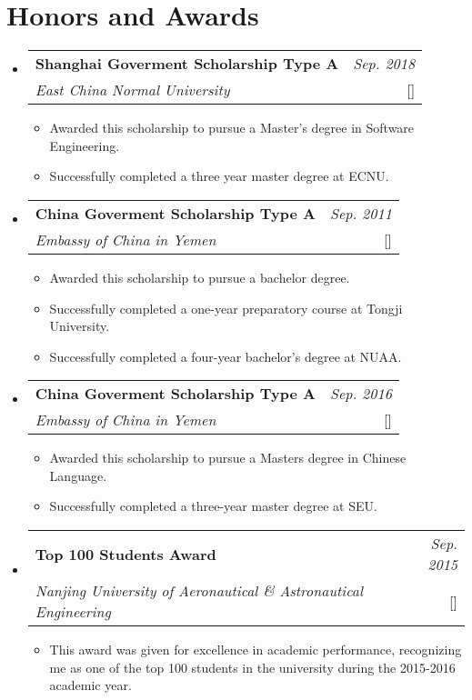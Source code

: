 \documentclass[a4paper,11pt]{article}
\makeatletter
\newcommand{\resumeProject}[4]{
	\vspace{0.5mm}\item
	\begin{tabular*}{0.98\textwidth}[t]{l@{\extracolsep{\fill}}r}
		\textbf{#1} & \textit{\footnotesize{#3}} \\
		\footnotesize{\textit{#2}} & \footnotesize{#4}
	\end{tabular*}
	\vspace{-2.4mm}
}
\newcommand{\resumeSubHeadingListStart}{\begin{itemize}[leftmargin=*,labelsep=1mm]}
\newcommand{\resumeItemListStart}{\begin{itemize}[leftmargin=*,labelsep=1mm,itemsep=0.5mm]}
\newcommand{\resumeSubHeadingListEnd}{\end{itemize}\vspace{2mm}}
\newcommand{\resumeItemListEnd}{\end{itemize}\vspace{-2mm}}
\makeatother
\begin{document}
	\section{\textbf{Honors and Awards}}
	\vspace{-0.4mm}
	\resumeSubHeadingListStart
	
	\resumeProject
	{Shanghai Goverment Scholarship Type A}
	{East China Normal University}
	{Sep. 2018}
	{{}[\href{https://www.study-shanghai.cn/c.asp?action=AS_SS_Entry}{\textcolor{darkblue}{\faIcon{globe}}}]}
	\resumeItemListStart
	\item Awarded this scholarship to pursue a Master’s degree in Software Engineering.
	\item Successfully completed a three year master degree at ECNU.
	\resumeItemListEnd

	\resumeProject
	{China Goverment Scholarship Type A}
	{Embassy of China in Yemen}
	{Sep. 2011}
	{{}[\href{https://www.csc.edu.cn/studyinchina/}{\textcolor{darkblue}{\faIcon{globe}}}]}
	\resumeItemListStart
	\item Awarded this scholarship to pursue a bachelor degree.
	\item Successfully completed a one-year preparatory course at Tongji University.
	\item Successfully completed a four-year bachelor's degree at NUAA.
	\resumeItemListEnd
	
	\resumeProject
	{China Goverment Scholarship Type A}
	{Embassy of China in Yemen}
	{Sep. 2016}
	{{}[\href{https://www.csc.edu.cn/studyinchina/}{\textcolor{darkblue}{\faIcon{globe}}}]}
	\resumeItemListStart
	\item Awarded this scholarship to pursue a Masters degree in Chinese Language.
	\item Successfully completed a three-year master degree at SEU.
	\resumeItemListEnd

	\resumeProject
	{Top 100 Students Award}
	{Nanjing University of Aeronautical \& Astronautical Engineering}
	{Sep. 2015}
	{{}[\href{http://nuaa.admissions.cn/}{\textcolor{darkblue}{\faIcon{globe}}}]}
	\resumeItemListStart
	\item This award was given for excellence in academic performance, recognizing me as one of the top 100 students in the university during the 2015-2016 academic year.
	\resumeItemListEnd


	\resumeSubHeadingListEnd


	\vspace{-6mm}
\end{document}
